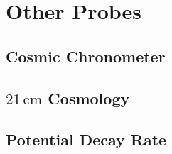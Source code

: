 \chapter{Other Probes}

\section{Cosmic Chronometer}

\section{$21\,\mathrm{cm}$ Cosmology}

\section{Potential Decay Rate}